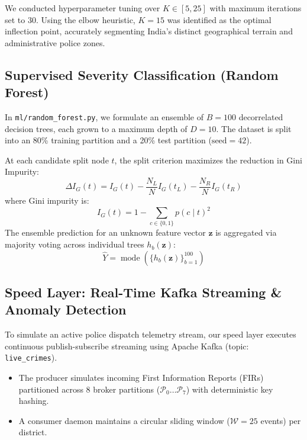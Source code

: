 \documentclass[conference]{IEEEtran}
\begin{document}
We conducted hyperparameter tuning over $K \in [5, 25]$ with maximum iterations set to 30. Using the elbow heuristic, $K=15$ was identified as the optimal inflection point, accurately segmenting India's distinct geographical terrain and administrative police zones.

\subsection{Supervised Severity Classification (Random Forest)}
In \texttt{ml/random_forest.py}, we formulate an ensemble of $B = 100$ decorrelated decision trees, each grown to a maximum depth of $D=10$. The dataset is split into an 80\% training partition and a 20\% test partition ($\text{seed}=42$).

At each candidate split node $t$, the split criterion maximizes the reduction in Gini Impurity:
\begin{equation}
    \Delta I_G(t) = I_G(t) - \frac{N_L}{N} I_G(t_L) - \frac{N_R}{N} I_G(t_R)
\end{equation}
where Gini impurity is:
\begin{equation}
    I_G(t) = 1 - \sum_{c \in \{0, 1\}} p(c \mid t)^2
\end{equation}
The ensemble prediction for an unknown feature vector $\mathbf{z}$ is aggregated via majority voting across individual trees $h_b(\mathbf{z})$:
\begin{equation}
    \hat{Y} = \operatorname{mode} \left( \{ h_b(\mathbf{z}) \}_{b=1}^{100} \right)
\end{equation}

\subsection{Speed Layer: Real-Time Kafka Streaming \& Anomaly Detection}
To simulate an active police dispatch telemetry stream, our speed layer executes continuous publish-subscribe streaming using Apache Kafka (topic: \texttt{live\_crimes}).
\begin{itemize}
    \item The producer simulates incoming First Information Reports (FIRs) partitioned across 8 broker partitions ($\mathcal{P}_0 \dots \mathcal{P}_7$) with deterministic key hashing.
    \item A consumer daemon maintains a circular sliding window ($\mathcal{W} = 25$ events) per district.
\end{itemize}
\end{document}
